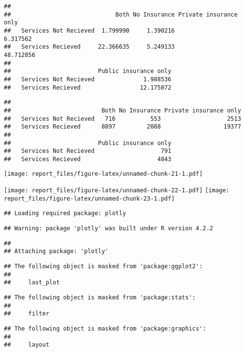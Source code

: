 \documentclass[
]{article}
\begin{document}
\begin{verbatim}
##                        
##                              Both No Insurance Private insurance only
##   Services Not Recieved  1.799990     1.390216               6.317562
##   Services Recieved     22.366635     5.249133              48.712856
##                        
##                         Public insurance only
##   Services Not Recieved              1.988536
##   Services Recieved                 12.175072
\end{verbatim}

\begin{verbatim}
##                        
##                          Both No Insurance Private insurance only
##   Services Not Recieved   716          553                   2513
##   Services Recieved      8897         2088                  19377
##                        
##                         Public insurance only
##   Services Not Recieved                   791
##   Services Recieved                      4843
\end{verbatim}

\texttt{[image: report\_files/figure-latex/unnamed-chunk-21-1.pdf]}

\texttt{[image: report\_files/figure-latex/unnamed-chunk-22-1.pdf]}
\texttt{[image: report\_files/figure-latex/unnamed-chunk-23-1.pdf]}

\begin{verbatim}
## Loading required package: plotly
\end{verbatim}

\begin{verbatim}
## Warning: package 'plotly' was built under R version 4.2.2
\end{verbatim}

\begin{verbatim}
## 
## Attaching package: 'plotly'
\end{verbatim}

\begin{verbatim}
## The following object is masked from 'package:ggplot2':
## 
##     last_plot
\end{verbatim}

\begin{verbatim}
## The following object is masked from 'package:stats':
## 
##     filter
\end{verbatim}

\begin{verbatim}
## The following object is masked from 'package:graphics':
## 
##     layout
\end{verbatim}
\end{document}
